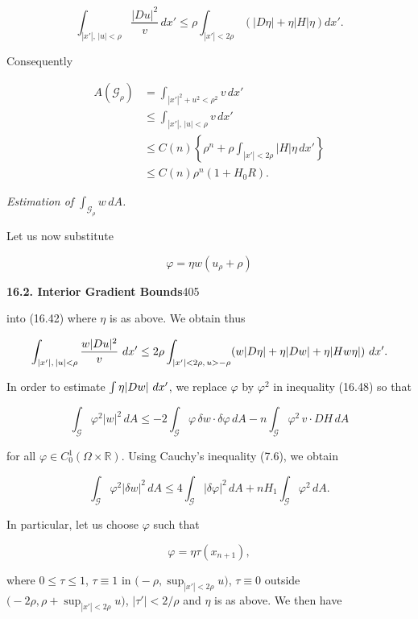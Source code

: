 \[
\int_{|x'|,\,|u|<\rho} \frac{|Du|^2}{v}\, dx' \leq \rho \int_{|x'|<2\rho} \left(|D\eta| + \eta |H| \eta \right) dx'.
\]

Consequently

\begin{align*}
A(\mathcal{G}_\rho) &= \int_{|x'|^2 + u^2 < \rho^2} v\, dx' \\
&\leq \int_{|x'|,\,|u|<\rho} v\, dx' \tag{16.53} \\
&\leq C(n)\left\{\rho^n + \rho \int_{|x'|<2\rho} |H|\eta\, dx'\right\} \\
&\leq C(n)\rho^n(1 + H_0 R).
\end{align*}

\textit{Estimation of $\int_{\mathcal{G}_\rho} w\, dA$.}

Let us now substitute

\[
\varphi = \eta w(u_\rho + \rho)
\]



\pagestyle{empty}



\setcounter{page}{405}

\noindent\textbf{16.2. Interior Gradient Bounds}\hfill 405

\bigskip

into (16.42) where $\eta$ is as above. We obtain thus

\[
\int_{|x'|,\,|u|<\rho} \frac{w|Du|^2}{v}\,\,dx'
\le 2\rho \int_{|x'|<2\rho,\,u>-\rho} (w|D\eta|+\eta|Dw|+\eta|Hw\eta|)\,\,dx'.
\]

In order to estimate $\int \eta|Dw|\,\,dx'$, we replace $\varphi$ by $\varphi^2$ in inequality (16.48) so that

\[
\int_{\mathcal{G}} \varphi^2|w|^2\,dA
\le -2\int_{\mathcal{G}} \varphi\,\delta w\cdot\delta\varphi\,dA
- n\int_{\mathcal{G}} \varphi^2\,v\cdot DH\,dA
\]

for all $\varphi\in C_0^1(\Omega\times\mathbb{R})$. Using Cauchy's inequality (7.6), we obtain

\[
\int_{\mathcal{G}} \varphi^2|\delta w|^2\,dA
\le 4\int_{\mathcal{G}} |\delta\varphi|^2\,dA + nH_1 \int_{\mathcal{G}} \varphi^2\,dA.
\]

In particular, let us choose $\varphi$ such that

\[
\varphi=\eta\tau(x_{n+1}),
\]

where $0\le \tau\le 1$, $\tau\equiv 1$ in $\bigl(-\rho,\sup_{|x'|<2\rho}u\bigr)$, $\tau\equiv 0$ outside $\bigl(-2\rho,\rho+\sup_{|x'|<2\rho}u\bigr)$, $|\tau'|<2/\rho$
and $\eta$ is as above. We then have

